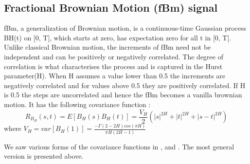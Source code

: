 \documentclass[a4paper]{article}
\begin{document}
\subsection{Fractional Brownian Motion (fBm) signal}
fBm, a generalization of Brownian motion, is a continuous-time Gaussian process BH(t) on [0, T], which starts at zero, has expectation zero for all t in [0, T]​.
​Unlike classical Brownian motion, the increments of fBm need not be independent and can be positively or negatively correlated. The degree of correlation is what characterises the process and is captured in the Hurst parameter(H). When H assumes a value lower than 0.5 the increments are negatively correlated and for values above 0.5 they are positively correlated. If H is 0.5 the steps are uncorrelated and hence the fBm becomes a vanilla brownian motion.
It has the following covariance function \cite{DBLP:journals/tit/TewfikK92}:
$$R_{B_H}(s,t)=E[B_H(s)B_H(t)]=\frac{V_H}{2}(|s|^{2H}+|t|^{2H}+|s-t|^{2H})$$
where $V_H=var[B_H(1)]=\frac{-\Gamma(2-2H)cos(\pi H)}{\pi H(2H-1)}$

We saw various forms of the covariance functions in \cite{DBLP:journals/tit/TewfikK92},\cite{DBLP:journals/tsp/LiHCZ09} and \cite{FBM_var}. The most general version is presented above. 
\end{document}
